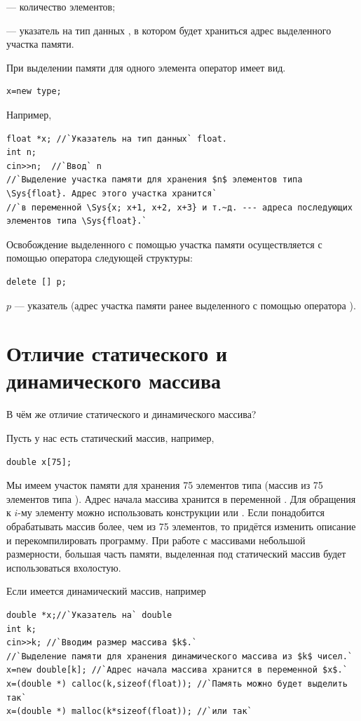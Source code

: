  --- количество элементов;

 --- указатель на тип данных , в котором будет храниться адрес выделенного
участка памяти.

При выделении памяти для одного элемента оператор  имеет вид.
\begin{lstlisting}
x=new type;
\end{lstlisting}
Например,
\begin{lstlisting}
float *x; //`Указатель на тип данных` float.
int n;
cin>>n;  //`Ввод` n 
//`Выделение участка памяти для хранения $n$ элементов типа \Sys{float}. Адрес этого участка хранится`
//`в переменной \Sys{x; x+1, x+2, x+3} и т.~д. --- адреса последующих элементов типа \Sys{float}.`
\end{lstlisting}
Освобождение выделенного с помощью  участка памяти осуществляется  с помощью оператора
 следующей структуры:
\begin{lstlisting}
delete [] p;
\end{lstlisting}
$p$ --- указатель (адрес участка памяти ранее выделенного с помощью оператора ).

\section[Отличие статического и динамического массива]{Отличие статического и динамического массива}
В чём же отличие статического и динамического массива?

Пусть у нас есть статический массив, например,
\begin{lstlisting}
double x[75];
\end{lstlisting}

Мы имеем участок памяти для хранения 75 элементов типа  (массив из 75 элементов типа
). Адрес начала массива хранится в переменной . Для обращения к
$i$-му элементу можно использовать конструкции  или
. Если понадобится обрабатывать массив более, чем из 75 элементов, то придётся изменить
описание и перекомпилировать программу. При работе с массивами небольшой размерности, большая часть памяти, выделенная
под статический массив будет использоваться вхолостую.

Если имеется динамический массив, например
\begin{lstlisting}
double *x;//`Указатель на` double
int k;
cin>>k; //`Вводим размер массива $k$.`
//`Выделение памяти для хранения динамического массива из $k$ чисел.` 
x=new double[k]; //`Адрес начала массива хранится в переменной $x$.`
x=(double *) calloc(k,sizeof(float)); //`Память можно будет выделить так`
x=(double *) malloc(k*sizeof(float)); //`или так`
\end{lstlisting}

